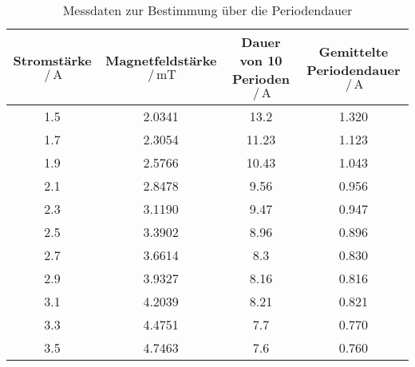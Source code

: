\begin{table}[h]
    \centering
   
    
    \begin{tabular}{c c c c}
      Stromstärke$\,/\,\si{\ampere}$  & Magnetfeldstärke$\,/\,\si{\milli\tesla}$ & Dauer von 10 Perioden$\,/\,\si{\ampere}$ & Gemittelte Periodendauer$\,/\,\si{\ampere}$ \\
      \toprule
      1.5 & 2.0341 & 13.2 & 1.320 \\
      1.7 & 2.3054 & 11.23 & 1.123 \\
      1.9 & 2.5766 & 10.43 & 1.043 \\
      2.1 & 2.8478 & 9.56 & 0.956 \\
      2.3 & 3.1190 & 9.47 & 0.947 \\
      2.5 & 3.3902 & 8.96 & 0.896 \\
      2.7 & 3.6614 & 8.3 & 0.830 \\
      2.9 & 3.9327 & 8.16 & 0.816 \\
      3.1 & 4.2039 & 8.21 & 0.821 \\
      3.3 & 4.4751 & 7.7 & 0.770 \\
      3.5 & 4.7463 & 7.6 & 0.760 \\
      \bottomrule
    \end{tabular}
    \caption{Messdaten zur Bestimmung über die Periodendauer}
    \label{tab:some_data2}
  \end{table}